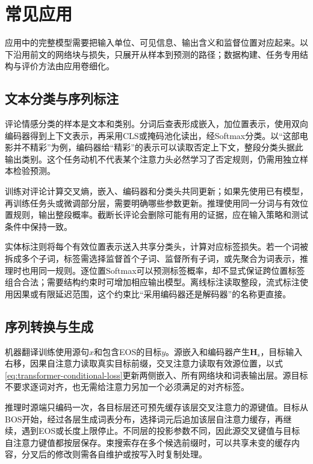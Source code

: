 \section{常见应用}
\label{sec:transformer-applications}

应用中的完整模型需要把输入单位、可见信息、输出含义和监督位置对应起来。以下沿用前文的网络块与损失，只展开从样本到预测的路径；数据构建、任务专用结构与评价方法由应用卷细化。

\subsection{文本分类与序列标注}
\label{sec:transformer-text-applications}

评论情感分类的样本是文本和类别。分词后查表形成嵌入，加位置表示，使用双向编码器得到上下文表示，再采用CLS或掩码池化读出，经Softmax分类。以“这部电影并不精彩”为例，编码器给“精彩”的表示可以读取否定上下文，整段分类头据此输出类别。这个任务动机不代表某个注意力头必然学习了否定规则，仍需用独立样本检验预测。

训练对评论计算交叉熵，嵌入、编码器和分类头共同更新；如果先使用已有模型，再训练任务头或微调部分层，需要明确哪些参数更新。推理使用同一分词与有效位置规则，输出整段概率。截断长评论会删除可能有用的证据，应在输入策略和测试条件中保持一致。

实体标注则将每个有效位置表示送入共享分类头，计算对应标签损失。若一个词被拆成多个子词，标签需选择监督首个子词、监督所有子词，或先聚合为词表示，推理时也用同一规则。逐位置Softmax可以预测标签概率，却不显式保证跨位置标签组合合法；需要结构约束时可增加相应输出模型。离线标注读取整段，流式标注使用因果或有限延迟范围，这个约束比“采用编码器还是解码器”的名称更直接。

\subsection{序列转换与生成}
\label{sec:transformer-generation-applications}

机器翻译训练使用源句$x$和包含EOS的目标$y$。源嵌入和编码器产生$\bm H_{\mathrm s}$，目标输入右移，因果自注意力读取真实目标前缀，交叉注意力读取有效源位置，以式\eqref{eq:transformer-conditional-loss}更新两侧嵌入、所有网络块和词表输出层。源目标不要求逐词对齐，也无需给注意力另加一个必须满足的对齐标签。

推理时源端只编码一次，各目标层还可预先缓存该层交叉注意力的源键值。目标从BOS开始，经过各层生成词表分布，选择词元后追加该层自注意力缓存，再继续，遇到EOS或长度上限停止。不同层的投影参数不同，因此源交叉键值与目标自注意力键值都按层保存。束搜索存在多个候选前缀时，可以共享未变的缓存内容，分叉后的修改则需各自维护或按写入时复制处理。

